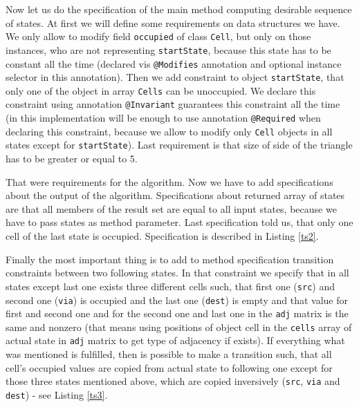 \documentclass[11pt,twoside,a4paper]{book}
\begin{document}
Now let us do the specification of the main method computing desirable sequence
of states. At first we will define some requirements on data structures we have.
We only allow to modify field \verb|occupied| of class \verb|Cell|, but only on
those instances, who are not representing \verb|startState|, because this state
has to be constant all the time (declared vis \verb|@Modifies| annotation and
optional instance selector in this annotation). Then we add constraint to object
\verb|startState|, that only one of the object in array \verb|Cells| can be
unoccupied. We declare this constraint using annotation \verb|@Invariant|
guarantees this constraint all the time (in this implementation will be enough
to use annotation \verb|@Required| when declaring this constraint, because we
allow to modify only \verb|Cell| objects in all states except for
\verb|startState|). Last requirement is that size of side of the triangle has
to be greater or equal to 5.



That were requirements for the algorithm. Now we have to add specifications
about the output of the algorithm. Specifications about returned array of states
are that all members of the result set are equal to all input states, because we
have to pass  states as method parameter. Last specification told us,
that only one cell of the last state is occupied. Specification is described in
Listing \ref{ts2}.
\newpage


Finally the most important thing is to add to method specification transition
constraints between two following states. In that constraint we specify that in
all states except last one exists three different cells such, that first one
(\verb|src|) and second one (\verb|via|) is occupied and the last one
(\verb|dest|) is empty and that value for first and second one and for the
second one and last one in the \verb|adj| matrix is the same and nonzero (that
means using positions of object cell in the \verb|cells| array of actual state
in \verb|adj| matrix to get type of adjacency if exists). If everything what was
mentioned is fulfilled, then is possible to make a transition such, that all
cell's occupied values are copied from actual state to following one except for
those three states mentioned above, which are copied inversively (\verb|src|,
\verb|via| and \verb|dest|) - see Listing \ref{ts3}.
\end{document}

